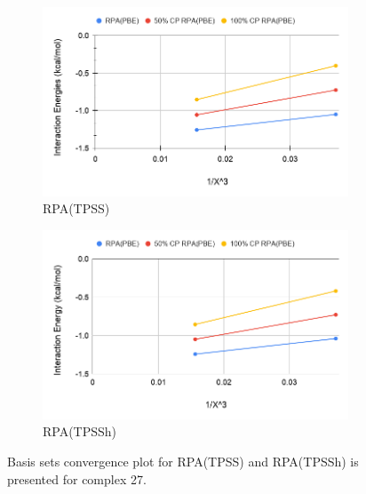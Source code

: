\documentclass[11pt]{article}
\begin{document}
\begin{figure}[hbpt]
  \centering
  \begin{subfigure}{.5\textwidth}
    \center
    \includegraphics[scale=0.3]{tpss_27.png}
    \caption{RPA(TPSS)}
    \label{fig:tpss_27}
  \end{subfigure}%
  \begin{subfigure}{.5\textwidth}
    \center
    \includegraphics[scale=0.3]{tpssh_27.png}
    \caption{RPA(TPSSh)}
    \label{fig:tpssh_27}
  \end{subfigure}
  \caption{Basis sets convergence plot for RPA(TPSS) and RPA(TPSSh) is
    presented for complex 27.}
  \label{fig:complex_27}
\end{figure}
\end{document}
